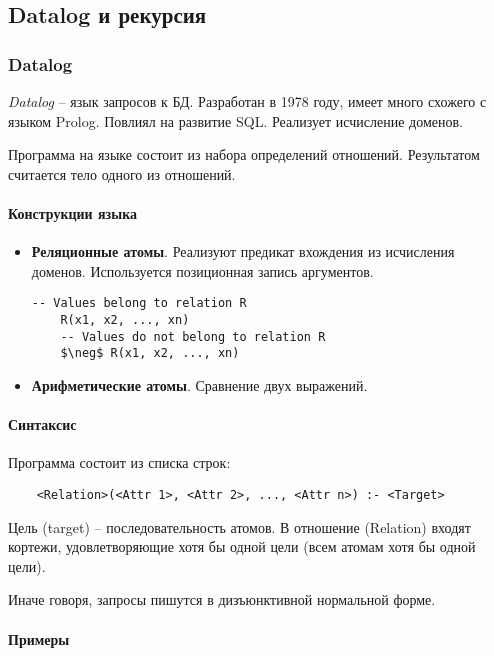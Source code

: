 \subsection{Datalog и рекурсия}

\subsubsection{Datalog}

\textit{Datalog} -- язык запросов к БД. Разработан в 1978 году, имеет много схожего с языком
Prolog. Повлиял
на развитие SQL. Реализует исчисление доменов.

Программа на языке состоит из набора определений отношений. Результатом считается тело одного из
отношений.

\paragraph{Конструкции языка}

\begin{itemize}
	\item \textbf{Реляционные атомы}. Реализуют предикат вхождения из исчисления доменов.
	      Используется позиционная запись аргументов.
	      \begin{lstlisting}[mathescape=true]
    -- Values belong to relation R
    R(x1, x2, ..., xn)
    -- Values do not belong to relation R
    $\neg$ R(x1, x2, ..., xn)
        \end{lstlisting}
	\item \textbf{Арифметические атомы}. Сравнение двух выражений.
\end{itemize}

\paragraph{Синтаксис}

Программа состоит из списка строк:

\begin{lstlisting}
    <Relation>(<Attr 1>, <Attr 2>, ..., <Attr n>) :- <Target>
\end{lstlisting}

Цель (target) -- последовательность атомов. В отношение (Relation) входят кортежи, удовлетворяющие
хотя бы одной цели (всем атомам хотя бы одной цели).

Иначе говоря, запросы пишутся в дизъюнктивной нормальной форме.

\paragraph{Примеры}

